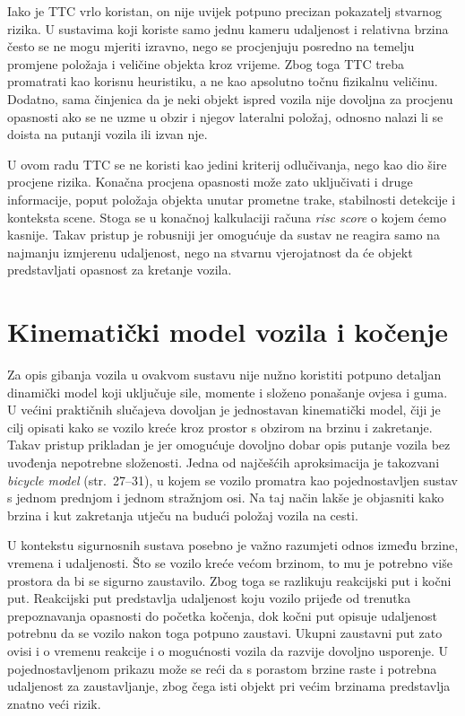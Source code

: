 Iako je TTC vrlo koristan, on nije uvijek potpuno precizan pokazatelj stvarnog rizika. U sustavima koji koriste samo jednu kameru udaljenost i relativna brzina često se ne mogu mjeriti izravno, nego se procjenjuju posredno na temelju promjene položaja i veličine objekta kroz vrijeme. Zbog toga TTC treba promatrati kao korisnu heuristiku, a ne kao apsolutno točnu fizikalnu veličinu. Dodatno, sama činjenica da je neki objekt ispred vozila nije dovoljna za procjenu opasnosti ako se ne uzme u obzir i njegov lateralni položaj, odnosno nalazi li se doista na putanji vozila ili izvan nje.

U ovom radu TTC se ne koristi kao jedini kriterij odlučivanja, nego kao dio šire procjene rizika. Konačna procjena opasnosti može zato uključivati i druge informacije, poput položaja objekta unutar prometne trake, stabilnosti detekcije i konteksta scene. Stoga se u konačnoj kalkulaciji računa \textit{risc score} o kojem ćemo kasnije. Takav pristup je robusniji jer omogućuje da sustav ne reagira samo na najmanju izmjerenu udaljenost, nego na stvarnu vjerojatnost da će objekt predstavljati opasnost za kretanje vozila.

\section{Kinematički model vozila i kočenje}
Za opis gibanja vozila u ovakvom sustavu nije nužno koristiti potpuno detaljan dinamički model koji uključuje sile, momente i složeno ponašanje ovjesa i guma. U većini praktičnih slučajeva dovoljan je jednostavan kinematički model, čiji je cilj opisati kako se vozilo kreće kroz prostor s obzirom na brzinu i zakretanje. Takav pristup prikladan je jer omogućuje dovoljno dobar opis putanje vozila bez uvođenja nepotrebne složenosti. Jedna od najčešćih aproksimacija je takozvani \textit{bicycle model} (str.~27--31)\supercite{rajamani2011}, u kojem se vozilo promatra kao pojednostavljen sustav s jednom prednjom i jednom stražnjom osi. Na taj način lakše je objasniti kako brzina i kut zakretanja utječu na budući položaj vozila na cesti.

U kontekstu sigurnosnih sustava posebno je važno razumjeti odnos između brzine, vremena i udaljenosti. Što se vozilo kreće većom brzinom, to mu je potrebno više prostora da bi se sigurno zaustavilo. Zbog toga se razlikuju reakcijski put i kočni put. Reakcijski put predstavlja udaljenost koju vozilo prijeđe od trenutka prepoznavanja opasnosti do početka kočenja, dok kočni put opisuje udaljenost potrebnu da se vozilo nakon toga potpuno zaustavi. Ukupni zaustavni put zato ovisi i o vremenu reakcije i o mogućnosti vozila da razvije dovoljno usporenje. U pojednostavljenom prikazu može se reći da s porastom brzine raste i potrebna udaljenost za zaustavljanje, zbog čega isti objekt pri većim brzinama predstavlja znatno veći rizik.

